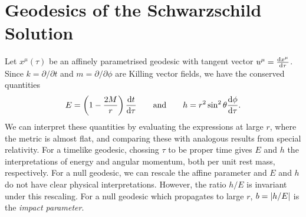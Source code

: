\section{Geodesics of the Schwarzschild Solution}%
\label{sec:geodesics_of_the_schwarzschild_solution}

Let $x^{\mu}(\tau)$ be an affinely parametrised geodesic with tangent vector $u^{\mu} = \dv{x^{\mu}}{\tau}$.
Since $k = \partial / \partial t$  and $m = \partial / \partial \phi$  are Killing vector fields, we have the conserved quantities
\begin{equation}
  E = \left(1 - \frac{2M}{r}\right) \dv{t}{\tau} \qquad \text{and} \qquad h = r^2 \sin^2 \theta \dv{\phi}{\tau}.
\end{equation}
We can interpret these quantities by evaluating the expressions at large $r$, where the metric is almost flat, and comparing these with analogous results from special relativity.
For a timelike geodesic, chossing $\tau$ to be proper time gives $E$ and $h$ the interpretations of energy and angular momentum, both per unit rest mass, respectively.
For a null geodesic, we can rescale the affine parameter and $E$ and $h$ do not have clear physical interpretations.
However, the ratio $h/E$ is invariant under this rescaling. For a null geodesic which propagates to large $r$, $b = \abs{h / E}$ is the \emph{impact parameter}.

